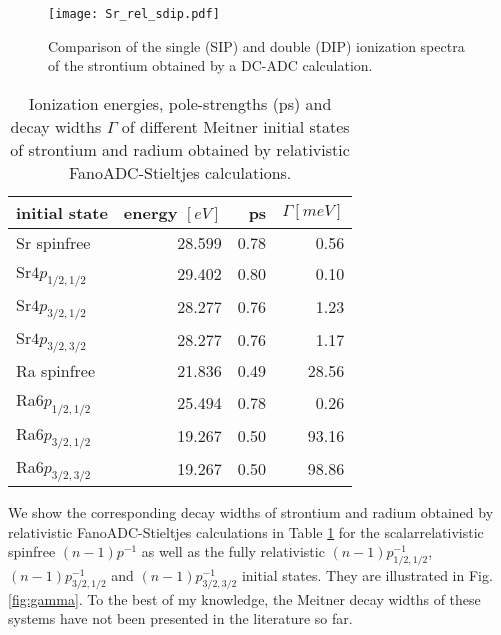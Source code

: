 \documentclass[aps,amssymb,preprint,a4paper]{revtex4}
\begin{document}
\begin{figure}[h]
 \centering
 \texttt{[image: Sr\_rel\_sdip.pdf]}
 \caption{Comparison of the single (SIP) and double (DIP) ionization spectra
          of the strontium obtained by a DC-ADC calculation.}
 \label{fig:sdip}
\end{figure}

%
\begin{table}[htb]
 \centering
 \caption{Ionization energies, pole-strengths (ps) and decay widths $\Gamma$ of
          different Meitner initial states of strontium and radium obtained
          by relativistic FanoADC-Stieltjes calculations.}
 \begin{tabular}{lrrr}
  \toprule
   initial state    & energy $[\unit{eV}]$ & ps & $\Gamma [\unit{meV}]$\\
  \midrule
   Sr spinfree      & 28.599 & 0.78 &   0.56\\  
   Sr$4p_{1/2,1/2}$ & 29.402 & 0.80 &   0.10\\
   Sr$4p_{3/2,1/2}$ & 28.277 & 0.76 &   1.23\\
   Sr$4p_{3/2,3/2}$ & 28.277 & 0.76 &   1.17\\
  \midrule
   Ra spinfree      & 21.836 & 0.49 &  28.56 \\  
   Ra$6p_{1/2,1/2}$ & 25.494 & 0.78 &   0.26\\
   Ra$6p_{3/2,1/2}$ & 19.267 & 0.50 &  93.16 \\
   Ra$6p_{3/2,3/2}$ & 19.267 & 0.50 &  98.86\\
  \bottomrule
 \end{tabular}
 \label{tab:widths}
\end{table}

We show the corresponding decay
widths of strontium and radium obtained by relativistic FanoADC-Stieltjes
calculations in Table \ref{tab:widths}
for the scalarrelativistic spinfree $(n-1)p^{-1}$ as well as the
fully relativistic $(n-1)p_{1/2,1/2}^{-1}$, $(n-1)p_{3/2,1/2}^{-1}$ and
$(n-1)p_{3/2,3/2}^{-1}$ initial states. They are illustrated in Fig. \ref{fig:gamma}.
To the best of my knowledge, the Meitner decay widths of these systems have
not been presented in the literature so far.
\end{document}

